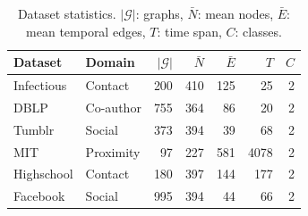 \begin{table}[t]
\centering
\caption{Dataset statistics. $|\mathcal{G}|$: graphs, $\bar{N}$: mean nodes, $\bar{E}$: mean temporal edges, $T$: time span, $C$: classes.}
\label{tab:datasets}
\small
\setlength{\tabcolsep}{5pt}
\begin{tabular}{llrrrrr}
\toprule
\textbf{Dataset} & \textbf{Domain} & $|\mathcal{G}|$ & $\bar{N}$ & $\bar{E}$ & $T$ & $C$ \\
\midrule
Infectious & Contact & 200 & 410 & 125 & 25 & 2 \\
DBLP & Co-author & 755 & 364 & 86 & 20 & 2 \\
Tumblr & Social & 373 & 394 & 39 & 68 & 2 \\
MIT & Proximity & 97 & 227 & 581 & 4078 & 2 \\
Highschool & Contact & 180 & 397 & 144 & 177 & 2 \\
Facebook & Social & 995 & 394 & 44 & 66 & 2 \\
\bottomrule
\end{tabular}
\end{table}